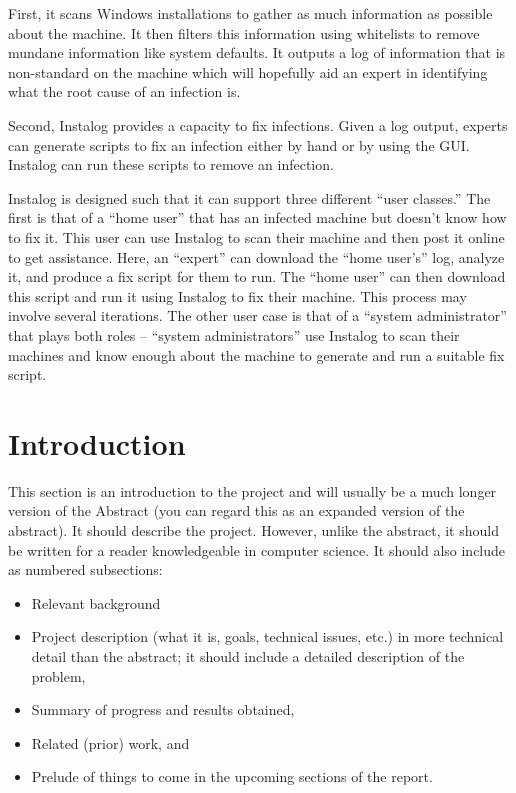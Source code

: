 \documentclass[letterpaper,12pt]{article}
\begin{document}
First, it scans Windows installations to gather as much information as possible
about the machine.  It then filters this information using whitelists to remove
mundane information like system defaults.  It outputs a log of information that
is non-standard on the machine which will hopefully aid an expert in identifying
what the root cause of an infection is.

Second, Instalog provides a capacity to fix infections.  Given a log output,
experts can generate scripts to fix an infection either by hand or by using the
GUI.  Instalog can run these scripts to remove an infection.  

Instalog is designed such that it can support three different ``user classes.'' 
The first is that of a ``home user'' that has an infected machine but doesn't
know how to fix it.  This user can use Instalog to scan their machine and then
post it online to get assistance.  Here, an ``expert'' can download the ``home
user's'' log, analyze it, and produce a fix script for them to run.  The ``home
user'' can then download this script and run it using Instalog to fix their
machine.  This process may involve several iterations.  The other user case is
that of a ``system administrator'' that plays both roles -- ``system
administrators'' use Instalog to scan their machines and know enough about the
machine to generate and run a suitable fix script.  

\newpage



\section{Introduction}
This section is an introduction to the project and will usually be a much longer
version of the Abstract (you can regard this as an expanded version of the
abstract). It should describe the project.
However, unlike the abstract, it should be written for a reader knowledgeable in
computer science. It should also include as numbered subsections:

\begin{itemize}
  \item Relevant background	
  \item Project description (what it is, goals, technical issues, etc.) in more
  technical detail than the abstract; it should include a detailed description
  of the problem,
  \item Summary of progress and results obtained,
  \item Related (prior) work, and
  \item Prelude of things to come in the upcoming sections of the report. 
\end{itemize}
\end{document}
